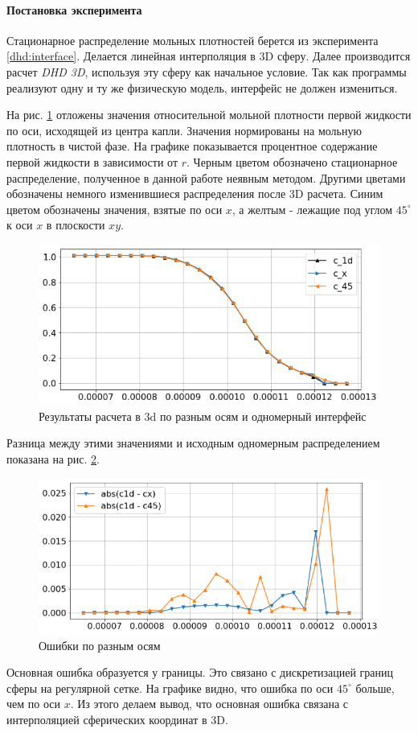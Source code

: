 \paragraph{Постановка эксперимента}
Стационарное распределение мольных плотностей берется из эксперимента \ref{dhd:interface}. Делается линейная интерполяция в 3D сферу. Далее производится расчет \textit{DHD 3D}, используя эту сферу как начальное условие. Так как программы реализуют одну и ту же физическую модель, интерфейс не должен измениться.
\par
На рис. \ref{fig:cross_validation_vals} отложены значения относительной мольной плотности первой жидкости по оси, исходящей из центра капли. Значения нормированы на мольную плотность в чистой фазе. На графике показывается процентное содержание первой жидкости в зависимости от $r$. Черным цветом обозначено стационарное распределение, полученное в данной работе неявным методом. Другими цветами обозначены немного изменившиеся распределения после 3D расчета. Синим цветом обозначены значения, взятые по оси $x$, а желтым - лежащие под углом $45^\circ$ к оси $x$ в плоскости $xy$. 
\begin{figure}[h]
\centering
\includegraphics[scale=0.8]{dhd_cross_validation/cross_validation_vals.png}
\caption{Результаты расчета в 3d по разным осям и одномерный интерфейс}
\label{fig:cross_validation_vals}
\end{figure}
\par
Разница между этими значениями и исходным одномерным распределением показана на рис. \ref{fig:cross_validation_error}.
\begin{figure}[h]
\centering
\includegraphics[scale=0.8]{dhd_cross_validation/cross_validation_error.png}
\caption{Ошибки по разным осям}
\label{fig:cross_validation_error}
\end{figure}
Основная ошибка образуется у границы. Это связано с дискретизацией границ сферы на регулярной сетке. На графике видно, что ошибка по оси $45^\circ$ больше, чем по оси $x$. Из этого делаем вывод, что основная ошибка связана с интерполяцией сферических координат в 3D.

